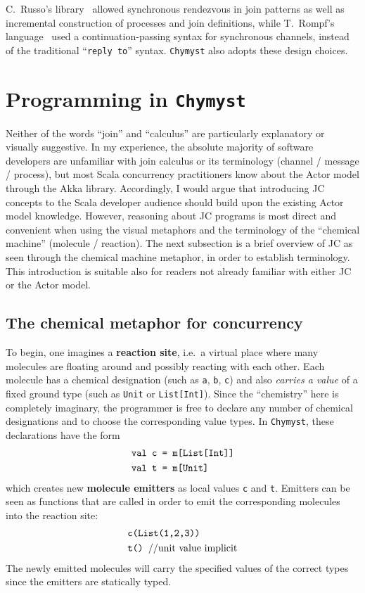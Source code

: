 \documentclass[sigplan,10pt,review,anonymous]{acmart}\settopmatter{printfolios=true}
\begin{document}
C.~Russo's library~\citep{Rus2007} allowed synchronous rendezvous
in join patterns as well as incremental construction of processes
and join definitions, while T.~Rompf's language~\citep{Rom2007}
used a continuation-passing syntax for synchronous channels, instead
of the traditional ``\texttt{reply to}'' syntax. \texttt{Chymyst}
also adopts these design choices.

\section{Programming in \texttt{Chymyst}}

Neither of the words ``join'' and ``calculus'' are particularly
explanatory or visually suggestive. In my experience, the absolute
majority of software developers are unfamiliar with join calculus
or its terminology (channel / message / process), but most
Scala concurrency practitioners know about the Actor model through
the Akka library. Accordingly, I would argue that introducing JC concepts
to the Scala developer audience should build upon the existing Actor
model knowledge. However, reasoning about JC programs is most direct
and convenient when using the visual metaphors and the terminology
of the ``chemical machine'' (molecule / reaction). The next subsection
is a brief overview of JC as seen through the chemical machine metaphor,
in order to establish terminology. This introduction is suitable also
for readers not already familiar with either JC or the Actor model.

\subsection{The chemical metaphor for concurrency}

To begin, one imagines a \textbf{reaction site}, i.e.~a virtual place
where many molecules are floating around and possibly reacting with
each other. Each molecule has a chemical designation (such as \texttt{a},
\texttt{b}, \texttt{c}) and also \emph{carries a value} of a fixed
ground type (such as \texttt{Unit} or \texttt{List{[}Int{]}}). Since
the ``chemistry'' here is completely imaginary, the programmer is
free to declare any number of chemical designations and to choose
the corresponding value types. In \texttt{Chymyst}, these declarations
have the form
\begin{align*}
\text{\texttt{val c }} & \text{\texttt{= m[List[Int]]}}\\
\text{\texttt{val t }} & \text{\texttt{= m[Unit]}}
\end{align*}
which creates new \textbf{molecule emitters} as local values
\texttt{c} and \texttt{t}. Emitters can be seen as functions that
are called in order to emit the corresponding molecules into the reaction
site:
\begin{align*}
 & \text{\texttt{c(List(1,2,3))}}\\
 & \text{\texttt{t() }//unit value implicit}
\end{align*}
The newly emitted molecules will carry the specified values of the
correct types since the emitters are statically typed.
\end{document}

